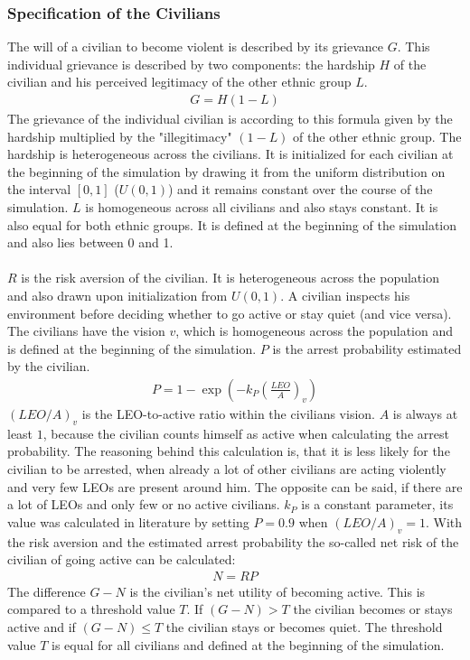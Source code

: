 \documentclass[11pt]{article}
\begin{document}
\subsubsection{Specification of the Civilians}
The will of a civilian to become violent is described by its grievance $G$. This individual grievance is described by two components: the hardship $H$ of the civilian and his perceived legitimacy of the other ethnic group $L$.
\begin{align}
G = H (1 - L)
\end{align}
The grievance of the individual civilian is according to this formula given by the hardship multiplied by the "illegitimacy" $(1 - L)$ of the other ethnic group. The hardship is heterogeneous across the civilians. It is initialized for each civilian at the beginning of the simulation by drawing it from the uniform distribution on the interval $[0,1]$ ($U(0,1)$) and it remains constant over the course of the simulation. $L$ is homogeneous across all civilians and also stays constant. It is also equal for both ethnic groups. It is defined at the beginning of the simulation and also lies between 0 and 1.\\
\\
$R$ is the risk aversion of the civilian. It is heterogeneous across the population and also drawn upon initialization from $U(0,1)$. A civilian inspects his environment before deciding whether to go active or stay quiet (and vice versa). The civilians have the vision $v$, which is homogeneous across the population and is defined at the beginning of the simulation. $P$ is the arrest probability estimated by the civilian.
\begin{align}
P = 1 - \exp \left( - k_P \left( \frac{LEO}{A} \right)_v \right)
\end{align}
$\left(LEO/A\right)_v$ is the LEO-to-active ratio within the civilians vision. $A$ is always at least $1$, because the civilian counts himself as active when calculating the arrest probability. The reasoning behind this calculation is, that it is less likely for the civilian to be arrested, when already a lot of other civilians are acting violently and very few LEOs are present around him. The opposite can be said, if there are a lot of LEOs and only few or no active civilians. $k_P$ is a constant parameter, its value was calculated in literature by setting $P = 0.9$ when $\left(LEO/A\right)_v = 1$. With the risk aversion and the estimated arrest probability the so-called net risk of the civilian of going active can be calculated:
\begin{align}
N = RP
\end{align}
The difference $G - N$ is the civilian's net utility of becoming active. This is compared to a threshold value $T$. If $(G - N) > T$ the civilian becomes or stays active and if $(G - N) \leq T$ the civilian stays or becomes quiet. The threshold value $T$ is equal for all civilians and defined at the beginning of the simulation.
\end{document}
